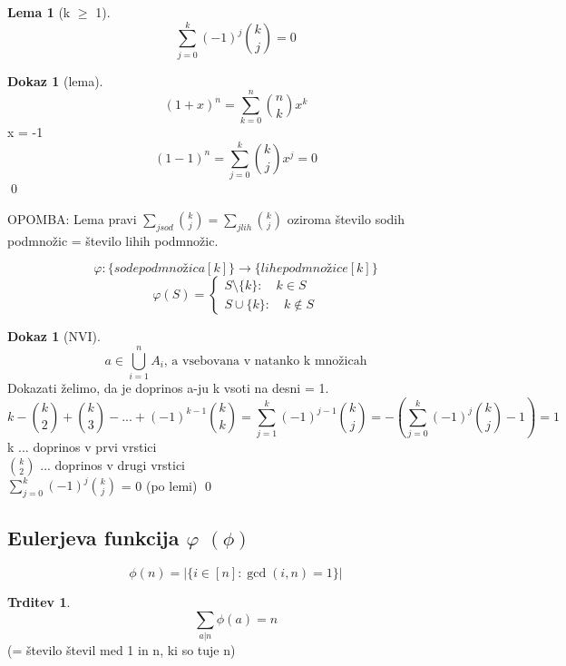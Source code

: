 \documentclass[a4paper,12pt]{article}
\theoremstyle{definition}
\newtheorem{lemma}[counter]{Lema}
\newtheorem{claim}[counter]{Trditev}
\newtheorem{pro}[counter]{Dokaz}
\theoremstyle{remark}
\begin{document}
\begin{lemma}[k $\geqslant$ 1]
\[\sum_{j = 0}^k (-1)^j \binom{k}{j} = 0\]
\end{lemma}

\begin{pro}[lema]
\[(1 + x)^n = \sum_{k = 0}^n \binom{n}{k} x^k\]
x = -1
\[(1 -1)^n = \sum_{j = 0}^k \binom{k}{j} x^j = 0\]
\qed
\end{pro}

OPOMBA: Lema pravi $\sum_{j sod} \binom{k}{j} = \sum_{j lih} \binom{k}{j}$ oziroma število sodih podmnožic = število lihih podmnožic.

\[\varphi: \{sode podmnožica [k]\} \rightarrow \{lihe podmnožice [k]\} \]
\[\varphi (S) = \begin{cases}S \setminus \{k\}: \quad k \in S  \\ S \cup \{k\}: \quad k \notin S \end{cases}\]

\begin{pro}[NVI]
\[a \in \bigcup_{i = 1}^{n} A_i \text{, a vsebovana v natanko k množicah}\]
Dokazati želimo, da je doprinos a-ju k vsoti na desni = 1.
\[k - \binom{k}{2} + \binom{k}{3} - ... + (-1)^{k-1} \binom{k}{k} = \sum_{j = 1}^{k} (-1)^{j - 1} \binom{k}{j} = - (\sum_{j = 0}^{k} (-1)^j \binom{k}{j} - 1) = 1\]
k ... doprinos v prvi vrstici\\
$\binom{k}{2}$ ... doprinos v drugi vrstici\\
$\displaystyle \sum_{j = 0}^{k} (-1)^j \binom{k}{j}$ = 0 (po lemi)
\qed
\end{pro}

\subsection{Eulerjeva funkcija $\varphi$ $(\phi)$}
\[\phi (n) = |\{i \in [n] : \gcd(i, n) = 1\}|\]
\begin{claim}
\[\sum_{a | n} \phi (a) = n\]
(= število števil med 1 in n, ki so tuje n)
\end{claim}
\end{document}
